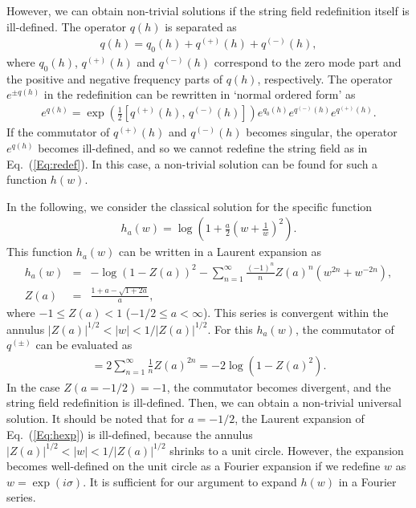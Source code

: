\documentclass[a4paper,seceq,preprint]{ptptex}
\newcommand{\nn}{\nonumber\\}
\newcommand{\abs}[1]{\left| #1 \right|}
\newcommand{\half}{\frac{1}{2}}
\begin{document}
However, we can obtain non-trivial solutions if the string field
redefinition itself is ill-defined. The operator $q(h)$ is separated as
\begin{eqnarray}
 q(h) = q_0(h)+q^{(+)}(h)+q^{(-)}(h),
\end{eqnarray}
where $q_0(h)$, $q^{(+)}(h)$ and $q^{(-)}(h)$ correspond to the zero
mode part and the positive and negative frequency parts of $q(h)$, respectively.
The operator $e^{\pm q(h)}$ in the redefinition can be rewritten in `normal
ordered form' as
\begin{eqnarray}
 e^{q(h)} = \exp\left(\half [
 q^{(+)}(h),\,q^{(-)}(h)]\right) 
  e^{q_0(h)}e^{q^{(-)}(h)}e^{q^{(+)}(h)}.
\end{eqnarray}
If the commutator of $q^{(+)}(h)$ and $q^{(-)}(h)$ becomes singular, the
operator $e^{q(h)}$ becomes ill-defined, and so we cannot redefine the string
field as in Eq.~(\ref{Eq:redef}). In this case, a non-trivial solution
can be found for such a function $h(w)$.


In the following, we consider the classical solution for the specific
function
\begin{eqnarray}
\label{Eq:ha}
 h_a(w) = \log\left(1+\frac{a}{2}\left(w+\frac{1}{w}\right)^2\right).
\end{eqnarray}
This function $h_a(w)$ can be written in a Laurent expansion as
\begin{eqnarray}
\label{Eq:hexp}
 h_a(w) &=& -\log(1-Z(a))^2 -\sum_{n=1}^\infty \frac{(-1)^n}{n}
Z(a)^n
\left(w^{2n}+w^{-2n}\right),\nn
 Z(a) &=& \frac{1+a-\sqrt{1+2a}}{a},
\end{eqnarray}
where $-1\leq Z(a)<1$ ($-1/2\leq a<\infty$). 
This series is convergent within the annulus $\abs{Z(a)}^{1/2}<
\abs{w}<1/\abs{Z(a)}^{1/2}$. 
For this $h_a(w)$, the commutator of $q^{(\pm)}$ can be
evaluated as
\begin{eqnarray}
 [q^{(+)}(h_a),\,q^{(-)}(h_a)] = 2\sum_{n=1}^\infty \frac{1}{n}Z(a)^{2n}
 =-2\log(1-Z(a)^2).
\end{eqnarray}
In the case $Z(a=-1/2)=-1$, the commutator becomes divergent, and the
string field redefinition is ill-defined. Then, we can obtain a
non-trivial universal solution. It should be noted that for $a=-1/2$,
the Laurent expansion of Eq.~(\ref{Eq:hexp}) is ill-defined, because the
annulus $\abs{Z(a)}^{1/2}< \abs{w}<1/\abs{Z(a)}^{1/2}$ shrinks to a
unit circle. However, the expansion becomes well-defined on the unit
circle as a Fourier expansion if we redefine $w$ as $w=\exp(i\sigma)$. 
It is sufficient for our argument to expand $h(w)$ in
a Fourier series. 
\end{document}

